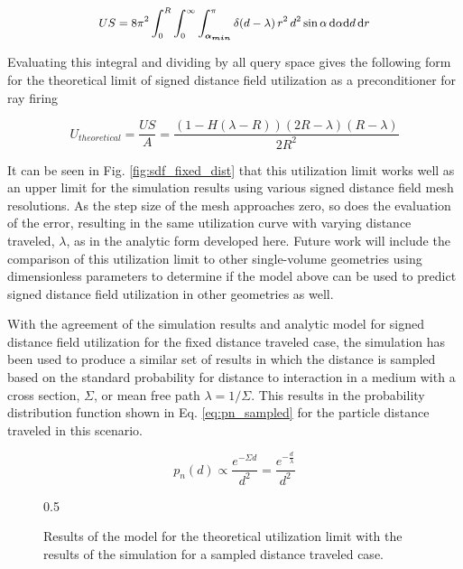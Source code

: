 \begin{equation}
  \label{eq:subs_a_cond}
\small US = 8\pi^2  \int_{0}^{R}\int_{0}^{\infty}\int_{\boldsymbol{\alpha_{min}}}^{\pi} \delta(d-\lambda) \,
r^2 \, d^2 \sin{\alpha} \, \mathrm{d}\alpha \mathrm{d}d \, \mathrm{d}r
\end{equation}

Evaluating this integral and dividing by all query space gives the
following form for the theoretical limit of signed distance field utilization as a
preconditioner for ray firing

\begin{equation}
U_{theoretical} = \frac{US}{A} =  \frac{(1-H(\lambda-R))(2R-\lambda)(R-\lambda)}{2R^2}
\end{equation}

It can be seen in Fig. \ref{fig:sdf_fixed_dist} that this utilization limit
works well as an upper limit for the simulation results using various signed
distance field mesh resolutions. As the step size of the mesh approaches zero,
so does the evaluation of the error, resulting in the same utilization curve
with varying distance traveled, $\lambda$, as in the analytic form developed
here. Future work will include the comparison of this utilization limit to other
single-volume geometries using dimensionless parameters to determine if the
model above can be used to predict signed distance field utilization in other
geometries as well.

With the agreement of the simulation results and analytic model for signed
distance field utilization for the fixed distance traveled case, the simulation
has been used to produce a similar set of results in which the distance is
sampled based on the standard probability for distance to interaction in a
medium with a cross section, $\Sigma$, or mean free path $\lambda
=1/\Sigma$. This results in the probability distribution function shown in
Eq. \ref{eq:pn_sampled} for the particle distance traveled in this scenario.

\begin{equation}
  \label{eq:pn_sampled}
p_n(d) \propto \frac{e^{-\Sigma d}}{d^{2}} = \frac{e^{-\frac{d}{\lambda}}}{d^{2}}
\end{equation}

\begin{figure}[ht]
\centering
{0.5\textwidth}
\caption{Results of the model for the theoretical utilization limit with the
results of the simulation for a sampled distance traveled case.}
\label{fig:sdf_sampled_dist}
\end{figure}

